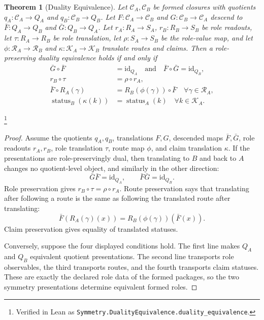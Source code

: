 \documentclass[11pt]{article}
\newtheorem{theorem}{Theorem}[section]
\theoremstyle{definition}
\begin{document}
\begin{theorem}[Duality Equivalence]\label{thm:F41}
Let \(\mathcal C_A,\mathcal C_B\) be formed closures with quotients
\(q_A:\mathcal C_A\to Q_A\) and \(q_B:\mathcal C_B\to Q_B\).  Let
\(F:\mathcal C_A\to\mathcal C_B\) and
\(G:\mathcal C_B\to\mathcal C_A\) descend to
\(\bar F:Q_A\to Q_B\) and \(\bar G:Q_B\to Q_A\).  Let
\(r_A:R_A\to S_A\), \(r_B:R_B\to S_B\) be role readouts, let
\(\tau:R_A\to R_B\) be role translation, let
\(\rho:S_A\to S_B\) be the role-value map, and let
\(\phi:\mathcal R_A\to\mathcal R_B\) and
\(\kappa:\mathcal K_A\to\mathcal K_B\) translate routes and claims.
Then a role-preserving duality equivalence holds if and only if
\begin{align*}
  \bar G\circ\bar F&=\mathrm{id}_{Q_A}
  \quad\text{and}\quad
  \bar F\circ\bar G=\mathrm{id}_{Q_B},\\
  r_B\circ\tau&=\rho\circ r_A,\\
  \bar F\circ R_A(\gamma)
  &=R_B(\phi(\gamma))\circ\bar F
  \quad\forall \gamma\in\mathcal R_A,\\
  \operatorname{status}_B(\kappa(k))
  &=\operatorname{status}_A(k)
  \quad\forall k\in\mathcal K_A.
\end{align*}
\end{theorem}
\footnote{Verified in Lean as
\texttt{Symmetry.DualityEquivalence.duality\_equivalence}.}
\begin{proof}
Assume the quotients \(q_A,q_B\), translations \(F,G\), descended
maps \(\bar F,\bar G\), role readouts \(r_A,r_B\), role translation
\(\tau\), route map \(\phi\), and claim translation \(\kappa\).  If
the presentations are role-preservingly dual, then translating to
\(B\) and back to \(A\) changes no quotient-level object, and
similarly in the other direction:
\[
  \bar G\bar F=\mathrm{id}_{Q_A},
  \qquad
  \bar F\bar G=\mathrm{id}_{Q_B}.
\]
Role preservation gives \(r_B\circ\tau=\rho\circ r_A\).  Route
preservation says that translating after following a route is the
same as following the translated route after translating:
\[
  \bar F(R_A(\gamma)(x))
  =
  R_B(\phi(\gamma))(\bar F(x)).
\]
Claim preservation gives equality of translated statuses.

Conversely, suppose the four displayed conditions hold.  The first
line makes \(Q_A\) and \(Q_B\) equivalent quotient presentations.
The second line transports role observables, the third transports
routes, and the fourth transports claim statuses.  These are exactly
the declared role data of the formed packages, so the two symmetry
presentations determine equivalent formed roles.
\end{proof}
\end{document}
